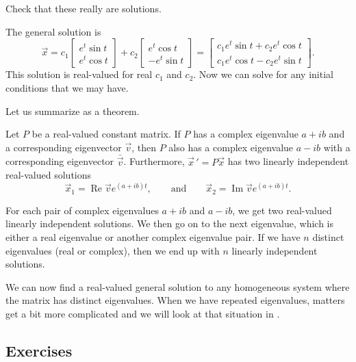 \documentclass[12pt]{book}
\begin{document}
\begin{exercise}
Check that these really are solutions.
\end{exercise}

The general solution is
\begin{equation*}
\vec{x}
=
c_1
\begin{bmatrix}
e^t \sin t  \\
e^t \cos t
\end{bmatrix} 
+ c_2
\begin{bmatrix}
e^t \cos t \\
-e^t \sin t
\end{bmatrix} 
=
\begin{bmatrix}
c_1 e^t \sin t + c_2 e^t \cos t \\
c_1 e^t \cos t - c_2 e^t \sin t
\end{bmatrix} .
\end{equation*}
This solution is real-valued for real $c_1$ and $c_2$.  Now we can solve
for any initial conditions that we may have.

\medskip

Let us summarize as a theorem.

\begin{theorem}
Let $P$ be a real-valued constant matrix.
If $P$ has a complex eigenvalue $a+ib$ and a corresponding eigenvector
$\vec{v}$, then $P$ also has a complex eigenvalue $a-ib$ with
a corresponding eigenvector $\bar{\vec{v}}$.
Furthermore,
${\vec{x}\,}' = P\vec{x}$ has
two linearly independent real-valued solutions
\begin{equation*}
\vec{x}_1 = \operatorname{Re} \vec{v} e^{(a+ib)t} ,
\qquad
\text{and}
\qquad
\vec{x}_2 = \operatorname{Im} \vec{v} e^{(a+ib)t} .
\end{equation*}
\end{theorem}

For each pair of complex eigenvalues $a+ib$ and $a-ib$,
we get two real-valued linearly
independent solutions.
We then go on to the next
eigenvalue, which is either a real eigenvalue or another complex eigenvalue
pair.  If we have $n$ distinct eigenvalues (real or complex), then we end up with $n$ linearly independent solutions.

We can now find a real-valued general solution to any homogeneous
system where the matrix has distinct eigenvalues.  When we have repeated
eigenvalues, matters get a bit more complicated and we will look at that
situation in .

\subsection{Exercises}
\end{document}
